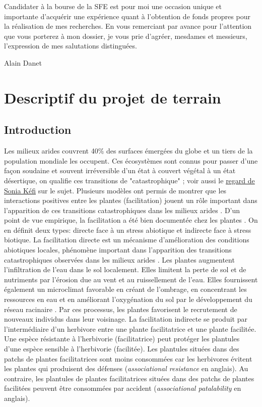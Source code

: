 \documentclass[12pt]{article} %
\begin{document}
Candidater à la bourse de la SFE est pour moi une occasion unique et importante d’acquérir une expérience quant à l’obtention de fonds propres pour la réalisation de mes recherches. En vous remerciant par avance pour l’attention que vous porterez à mon dossier, je vous prie d’agréer, mesdames et messieurs, l’expression de mes salutations distinguées.
\begin{flushright}
Alain Danet
\end{flushright}
\clearpage

\section{Descriptif du projet de terrain}

\subsection{Introduction}

Les milieux arides couvrent 40\% des surfaces émergées du globe et un tiers de la population mondiale les occupent. Ces écosystèmes sont connus pour passer d'une façon soudaine et souvent irréversible d'un  état à couvert végétal à un état désertique, on qualifie ces transitions de "catastrophique" \citep{Scheffer2001,Kefi2007}; voir aussi le \href{http://www.sfecologie.org/regards/2012/10/19/r37-hysteresis-sonia-kefi/}{regard de Sonia Kéfi} sur le sujet. Plusieurs modèles ont permis de montrer que les interactions positives entre les plantes (facilitation) jouent un rôle important dans l'apparition de ces transitions catastrophiques dans les milieux arides \citep{Kefi2007,Kefi2007a,Rietkerk2004}. D'un point de vue empirique, la facilitation a été bien documentée chez les plantes \citep{Callaway1995, Callaway1997}. On en définit deux types: directe face à un stress abiotique et indirecte face à stress biotique. La facilitation directe est un mécanisme d'amélioration des conditions abiotiques locales, phénomène important dans l'apparition des transitions catastrophiques observées dans les milieux arides \citep{Kefi2007a}. Les plantes augmentent l'infiltration de l'eau dans le sol localement. Elles limitent la perte de sol et de nutriments par l'érosion due au vent et au ruissellement de l'eau. Elles fournissent également un microclimat favorable en créant de l'ombrage, en concentrant les ressources en eau et en améliorant l'oxygénation du sol par le développement du réseau racinaire \citep{Rietkerk1997a}. Par ces processus, les plantes favorisent le recrutement de nouveaux individus dans leur voisinage. La facilitation indirecte se produit par l'intermédiaire d'un herbivore entre une plante facilitatrice et une plante facilitée. Une espèce résistante à l'herbivorie (facilitatrice) peut protéger les plantules d'une espèce sensible à l'herbivorie (facilitée). Les plantules situées dans des patchs de plantes facilitatrices sont moins consommées car les herbivores évitent les plantes qui produisent des défenses (\textit{associational resistance} en anglais). Au contraire, les plantules de plantes facilitatrices situées dans des patchs de plantes facilitées peuvent être consommées par accident (\textit{associational patalability} en anglais).
\end{document}
